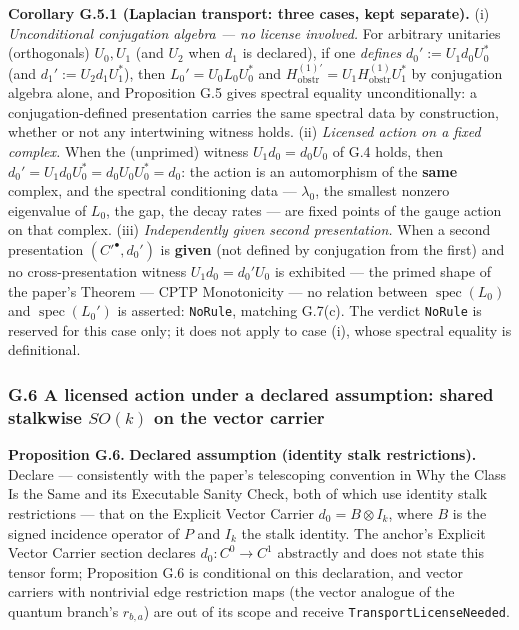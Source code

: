 \documentclass[
  11pt,
]{article}
\begin{document}
\textbf{Corollary G.5.1 (Laplacian transport: three cases, kept separate).}
(i) \emph{Unconditional conjugation algebra --- no license involved.} For arbitrary unitaries (orthogonals) \(U_0,U_1\) (and \(U_2\) when \(d_1\) is declared), if one \emph{defines} \(d_0':=U_1d_0U_0^*\) (and \(d_1':=U_2d_1U_1^*\)), then \(L_0'=U_0L_0U_0^*\) and \(H^{(1)\prime}_{\mathrm{obstr}}=U_1H^{(1)}_{\mathrm{obstr}}U_1^*\) by conjugation algebra alone, and Proposition G.5 gives spectral equality unconditionally: a conjugation-defined presentation carries the same spectral data by construction, whether or not any intertwining witness holds.
(ii) \emph{Licensed action on a fixed complex.} When the (unprimed) witness \(U_1d_0=d_0U_0\) of G.4 holds, then \(d_0'=U_1d_0U_0^*=d_0U_0U_0^*=d_0\): the action is an automorphism of the \textbf{same} complex, and the spectral conditioning data --- \(\lambda_0\), the smallest nonzero eigenvalue of \(L_0\), the gap, the decay rates --- are fixed points of the gauge action on that complex.
(iii) \emph{Independently given second presentation.} When a second presentation \((C'^\bullet,d_0')\) is \textbf{given} (not defined by conjugation from the first) and no cross-presentation witness \(U_1d_0=d_0'U_0\) is exhibited --- the primed shape of the paper's Theorem --- CPTP Monotonicity --- no relation between \(\operatorname{spec}(L_0)\) and \(\operatorname{spec}(L_0')\) is asserted: \texttt{NoRule}, matching G.7(c). The verdict \texttt{NoRule} is reserved for this case only; it does not apply to case (i), whose spectral equality is definitional.

\subsubsection{\texorpdfstring{G.6 A licensed action under a declared assumption: shared stalkwise \(SO(k)\) on the vector carrier}{G.6 A licensed action under a declared assumption: shared stalkwise SO(k) on the vector carrier}}\label{g.6-a-licensed-action-under-a-declared-assumption-shared-stalkwise-sok-on-the-vector-carrier}

\textbf{Proposition G.6.} \textbf{Declared assumption (identity stalk restrictions).} Declare --- consistently with the paper's telescoping convention in Why the Class Is the Same and its Executable Sanity Check, both of which use identity stalk restrictions --- that on the Explicit Vector Carrier \(d_0=B\otimes I_k\), where \(B\) is the signed incidence operator of \(P\) and \(I_k\) the stalk identity. The anchor's Explicit Vector Carrier section declares \(d_0:C^0\to C^1\) abstractly and does not state this tensor form; Proposition G.6 is conditional on this declaration, and vector carriers with nontrivial edge restriction maps (the vector analogue of the quantum branch's \(r_{b,a}\)) are out of its scope and receive \texttt{TransportLicenseNeeded}.
\end{document}
